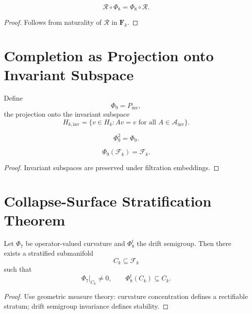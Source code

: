 \begin{lemma}
\[
\mathcal{R} \circ \Phi_8 = \Phi_8 \circ \mathcal{R}.
\]
\end{lemma}

\begin{proof}
Follows from naturality of $\mathcal{R}$ in $\mathbf{F}_k$.
\end{proof}

\section{Completion as Projection onto Invariant Subspace}

\begin{definition}
Define
\[
\Phi_9 = P_{\mathrm{inv}},
\]
the projection onto the invariant subspace
\[
H_{k,\mathrm{inv}} = \{v \in H_k : Av = v \text{ for all } A \in \mathcal{A}_{\mathrm{inv}}\}.
\]
\end{definition}

\begin{lemma}[Idempotence]
\[
\Phi_9^2 = \Phi_9.
\]
\end{lemma}

\begin{lemma}
\[
\Phi_9(\mathcal{F}_k) = \mathcal{F}_k.
\]
\end{lemma}

\begin{proof}
Invariant subspaces are preserved under filtration embeddings.
\end{proof}

\section{Collapse-Surface Stratification Theorem}

\begin{theorem}
Let $\Phi_7$ be operator-valued curvature and $\Phi_8^t$ the drift semigroup.
Then there exists a stratified submanifold
\[
C_k \subseteq \mathcal{F}_k
\]
such that
\[
\Phi_7|_{C_k} \neq 0,
\qquad
\Phi_8^t(C_k) \subseteq C_k.
\]
\end{theorem}

\begin{proof}
Use geometric measure theory: curvature concentration defines a rectifiable
stratum; drift semigroup invariance defines stability.
\end{proof}

